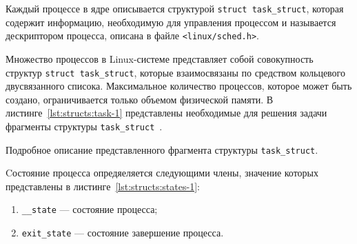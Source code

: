 Каждый процессе в ядре описывается структурой \texttt{struct task\_struct}, которая содержит информацию, необходимую для управления процессом и называется дескриптором процесса, описана в файле \texttt{<linux/sched.h>}.

Множество процессов в Linux-системе представляет собой совокупность структур \texttt{struct task\_struct}, которые взаимосвязаны по средством  кольцевого двусвязанного списока. 
Максимальное количество процессов, которое может быть создано, ограничивается только объемом физической памяти.
В листинге~\ref{lst:structs:task-1} представлены необходимые для решения задачи фрагменты структуры \texttt{task\_struct}~\cite{structs:task}.







Подробное описание представленного фрагмента структуры \texttt{task\_struct}.

Cостояние процесса опредяеляется следующими члены, значение которых представлены в листинге~\ref{lst:structs:states-1}:
\begin{enumerate}
	\item \texttt{\_\_state} --- состояние процесса;
	\item \texttt{exit\_state} --- состояние завершение процесса.
\end{enumerate}




\clearpage

